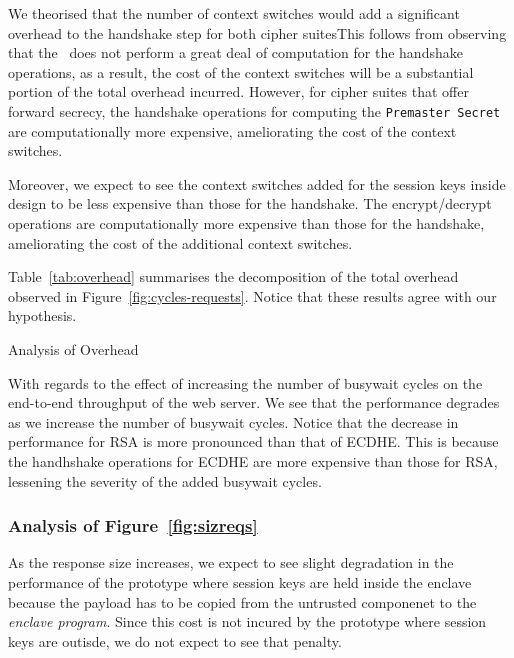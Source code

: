 \documentclass[../../../main.tex]{subfiles}
\begin{document}
We theorised that the number of context switches would add a
significant overhead to the handshake step for both cipher suitesThis
follows from observing that the \enclaveprogram~does not perform a
great deal of computation for the handshake operations, as a result,
the cost of the context switches will be a substantial portion of the
total overhead incurred. However, for cipher suites that offer forward
secrecy, the handshake operations for computing the \texttt{Premaster
  Secret} are computationally more expensive, ameliorating the cost of
the context switches.

Moreover, we expect to see the context switches added for the session
keys inside design to be less expensive than those for the handshake.
The encrypt/decrypt operations are computationally more expensive than
those for the handshake, ameliorating the cost of the additional
context switches.

Table~\ref{tab:overhead} summarises the decomposition of the total
overhead observed in Figure~\ref{fig:cycles-requests}. Notice that
these results agree with our hypothesis.

\begin{table}[H]
  \caption{Analysis of Overhead}
  \label{tab:overhead}
\end{table}

With regards to the effect of increasing the number of busywait cycles
on the end-to-end throughput of the web server. We see that the
performance degrades as we increase the number of busywait cycles.
Notice that the decrease in performance for RSA is more pronounced
than that of ECDHE. This is because the handhshake operations for
ECDHE are more expensive than those for RSA, lessening the severity of
the added busywait cycles.
\subsubsection*{Analysis of Figure~\ref{fig:sizreqs}}
As the response size increases, we expect to see slight degradation in
the performance of the prototype where session keys are held inside
the enclave because the payload has to be copied from the untrusted
componenet to the \textit{enclave program}. Since this cost is not
incured by the prototype where session keys are outisde, we do not
expect to see that penalty.
\end{document}
